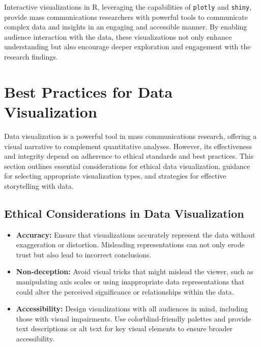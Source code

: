\documentclass[
]{book}
\begin{document}
Interactive visualizations in R, leveraging the capabilities of \texttt{plotly} and \texttt{shiny}, provide mass communications researchers with powerful tools to communicate complex data and insights in an engaging and accessible manner. By enabling audience interaction with the data, these visualizations not only enhance understanding but also encourage deeper exploration and engagement with the research findings.

\hypertarget{best-practices-for-data-visualization}{%
\section{Best Practices for Data Visualization}\label{best-practices-for-data-visualization}}

Data visualization is a powerful tool in mass communications research, offering a visual narrative to complement quantitative analyses. However, its effectiveness and integrity depend on adherence to ethical standards and best practices. This section outlines essential considerations for ethical data visualization, guidance for selecting appropriate visualization types, and strategies for effective storytelling with data.

\hypertarget{ethical-considerations-in-data-visualization}{%
\subsection{Ethical Considerations in Data Visualization}\label{ethical-considerations-in-data-visualization}}

\begin{itemize}
\item
  \textbf{Accuracy:} Ensure that visualizations accurately represent the data without exaggeration or distortion. Misleading representations can not only erode trust but also lead to incorrect conclusions.
\item
  \textbf{Non-deception:} Avoid visual tricks that might mislead the viewer, such as manipulating axis scales or using inappropriate data representations that could alter the perceived significance or relationships within the data.
\item
  \textbf{Accessibility:} Design visualizations with all audiences in mind, including those with visual impairments. Use colorblind-friendly palettes and provide text descriptions or alt text for key visual elements to ensure broader accessibility.
\end{itemize}
\end{document}
